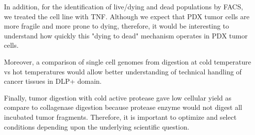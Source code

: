  In addition, for the identification of live/dying and dead populations by FACS, we treated the cell line with TNF\textalpha. Although we expect that PDX tumor cells are more fragile and more prone to dying, therefore, it would be interesting to understand how quickly this "dying to dead" mechanism operates in PDX tumor cells. 

Moreover, a comparison of single cell genomes from digestion at cold temperature vs hot temperatures would allow better understanding of technical handling of cancer tissues in DLP+ domain.

Finally, tumor digestion with cold active protease gave low cellular yield as compare to collagenase digestion because protease enzyme would not digest all incubated tumor fragments. Therefore, it is important to optimize and select conditions depending upon the underlying scientific question.



